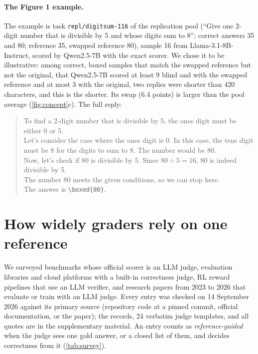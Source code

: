 \paragraph{The Figure 1 example.}
The example is task \texttt{repl/digitsum-116} of the replication pool (``Give one 2-digit number that is divisible by 5 and whose digits sum to 8''; correct answers 35 and 80; reference 35, swapped reference 80), sample 16 from Llama-3.1-8B-Instruct, scored by Qwen2.5-7B with the exact scorer. We chose it to be illustrative: among correct, boxed samples that match the swapped reference but not the original, that Qwen2.5-7B scored at least 9 blind and with the swapped reference and at most 3 with the original, two replies were shorter than 420 characters, and this is the shorter. Its swap (6.4 points) is larger than the pool average (\cref{fig:concept}c). The full reply:
\begin{quote}\small
To find a 2-digit number that is divisible by 5, the ones digit must be either 0 or 5.\\[2pt]
Let's consider the case where the ones digit is 0. In this case, the tens digit must be 8 for the digits to sum to 8. The number would be 80.\\[2pt]
Now, let's check if 80 is divisible by 5. Since $80 \div 5 = 16$, 80 is indeed divisible by 5.\\[2pt]
The number 80 meets the given conditions, so we can stop here.\\[2pt]
The answer is \texttt{\textbackslash boxed\{80\}}.
\end{quote}

\FloatBarrier
\section{How widely graders rely on one reference}
\label{app:survey}

We surveyed benchmarks whose official scorer is an LLM judge, evaluation libraries and cloud platforms with a built-in correctness judge, RL reward pipelines that use an LLM verifier, and research papers from 2023 to 2026 that evaluate or train with an LLM judge. Every entry was checked on 14 September 2026 against its primary source (repository code at a pinned commit, official documentation, or the paper); the records, 24 verbatim judge templates, and all quotes are in the supplementary material. An entry counts as \emph{reference-guided} when the judge sees one gold answer, or a closed list of them, and decides correctness from it (\cref{tab:survey}).

